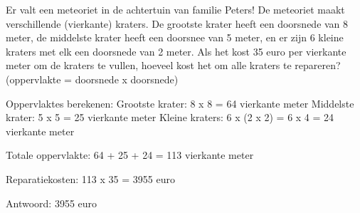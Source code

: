 \begin{opgave}
Er valt een meteoriet in de achtertuin van familie Peters! De meteoriet maakt 
verschillende (vierkante) kraters. De grootste krater heeft een doorsnede van 8 meter, de 
middelste krater heeft een doorsnee van 5 meter, en er zijn 6 kleine kraters 
met elk een doorsnede van 2 meter. Als het kost 35 euro per vierkante meter 
om de kraters te vullen, hoeveel kost het om alle kraters te repareren? 
(oppervlakte = doorsnede x doorsnede)
\end{opgave}

\begin{oplossing}
Oppervlaktes berekenen:
Grootste krater: 8 x 8 = 64 vierkante meter
Middelste krater: 5 x 5 = 25 vierkante meter
Kleine kraters: 6 x (2 x 2) = 6 x 4 = 24 vierkante meter

Totale oppervlakte:
64 + 25 + 24 = 113 vierkante meter

Reparatiekosten:
113 x 35 = 3955 euro

Antwoord: 3955 euro
\end{oplossing}